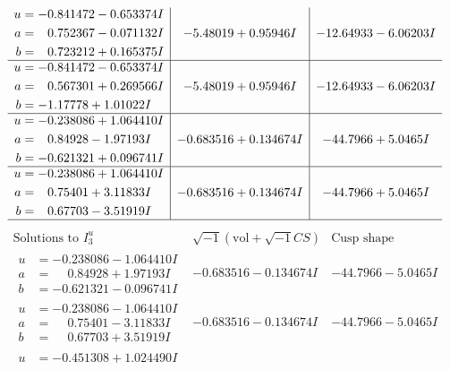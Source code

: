 \documentclass[1p]{elsarticle_modified}
\theoremstyle{definition}
\newcommand{\I}{\sqrt{-1}}
\begin{document}
$$\begin{array}{c|c|c}
\begin{aligned}
u &= -0.841472 - 0.653374 I \\
a &= \phantom{-}0.752367 - 0.071132 I \\
b &= \phantom{-}0.723212 + 0.165375 I\end{aligned}
 & -5.48019 + 0.95946 I & -12.64933 - 6.06203 I \\ \hline\begin{aligned}
u &= -0.841472 - 0.653374 I \\
a &= \phantom{-}0.567301 + 0.269566 I \\
b &= -1.17778 + 1.01022 I\end{aligned}
 & -5.48019 + 0.95946 I & -12.64933 - 6.06203 I \\ \hline\begin{aligned}
u &= -0.238086 + 1.064410 I \\
a &= \phantom{-}0.84928 - 1.97193 I \\
b &= -0.621321 + 0.096741 I\end{aligned}
 & -0.683516 + 0.134674 I & -44.7966 + 5.0465 I \\ \hline\begin{aligned}
u &= -0.238086 + 1.064410 I \\
a &= \phantom{-}0.75401 + 3.11833 I \\
b &= \phantom{-}0.67703 - 3.51919 I\end{aligned}
 & -0.683516 + 0.134674 I & -44.7966 + 5.0465 I\\
 \hline 
 \end{array}$$\newpage$$\begin{array}{c|c|c}  
\text{Solutions to }I^u_{3}& \I (\text{vol} + \sqrt{-1}CS) & \text{Cusp shape}\\
 \hline 
\begin{aligned}
u &= -0.238086 - 1.064410 I \\
a &= \phantom{-}0.84928 + 1.97193 I \\
b &= -0.621321 - 0.096741 I\end{aligned}
 & -0.683516 - 0.134674 I & -44.7966 - 5.0465 I \\ \hline\begin{aligned}
u &= -0.238086 - 1.064410 I \\
a &= \phantom{-}0.75401 - 3.11833 I \\
b &= \phantom{-}0.67703 + 3.51919 I\end{aligned}
 & -0.683516 - 0.134674 I & -44.7966 - 5.0465 I \\ \hline\begin{aligned}
u &= -0.451308 + 1.024490 I \\

\end{aligned}
\end{array}$$
\end{document}

